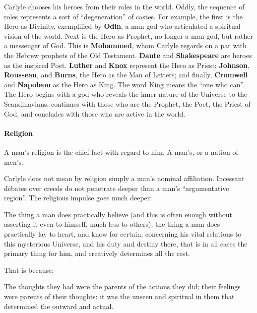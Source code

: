Carlyle chooses his heroes from their roles in the world. Oddly, the sequence of roles represents a sort of ``degeneration'' of castes. For example, the first is the Hero as Divinity, exemplified by
\textbf{Odin}, a man-god who articulated a spiritual vision of the world. Next is the Hero as Prophet, no longer a man-god, but rather a messenger of God. This is \textbf{Mohammed}, whom Carlyle regards on a par with the Hebrew prophets of the Old Testament. \textbf{Dante} and \textbf{Shakespeare} are heroes as the inspired Poet. \textbf{Luther} and \textbf{Knox} represent the Hero as Priest; \textbf{Johnson}, \textbf{Rousseau}, and \textbf{Burns}, the Hero as the Man of Letters; and finally, \textbf{Cromwell} and \textbf{Napoleon} as the Hero as King. The word King means the ``one who can''. The Hero begins with a god who reveals the inner nature of the Universe to the Scandinavians, continues with those who are the Prophet, the Poet, the Priest of God, and concludes with those who are active in the world.

\paragraph{Religion}


\begin{quotex}
A man's religion is the chief fact with regard to him. A man's, or a nation of men's.
\end{quotex}


Carlyle does not mean by religion simply a man's nominal affiliation. Incessant debates over creeds do not penetrate deeper than a man's ``argumentative region''. The religious impulse goes much deeper:

\begin{quotex}
The thing a man does practically believe (and this is often enough without asserting it even to himself, much less to others); the thing a man does practically lay to heart, and know for certain, concerning his vital relations to this mysterious Universe, and his duty and destiny there, that is in all cases the primary thing for him, and creatively determines all the rest.
\end{quotex}


That is because:

\begin{quotex}
The thoughts they had were the parents of the actions they did; their feelings were parents of their thoughts: it was the unseen and spiritual in them that determined the outward and actual.
\end{quotex}


